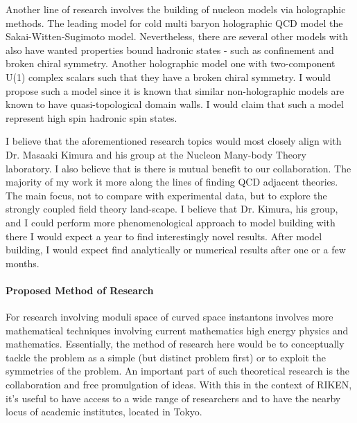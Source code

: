 \documentclass[12pt]{article}
\begin{document}
Another line of research involves the building of nucleon models via holographic methods.
%
The leading model for cold multi baryon holographic QCD model the Sakai-Witten-Sugimoto model.
%
Nevertheless, there are several other models with also have wanted properties bound hadronic states - such as confinement and broken chiral symmetry.
%
Another holographic model one with two-component U(1) complex scalars such that they have a broken chiral symmetry.
%
I would propose such a model since it is known that similar non-holographic models are known to have quasi-topological domain walls.
%
I would claim that such a model represent high spin hadronic spin states.

I believe that the aforementioned research topics would most closely align with Dr. Masaaki Kimura and his group at the Nucleon Many-body Theory laboratory.
%
I also believe that is there is mutual benefit to our collaboration.
%
The majority of my work it more along the lines of finding QCD adjacent theories.
%
The main focus, not to compare with experimental data, but to explore the strongly coupled field theory land-scape.
%
I believe that Dr. Kimura, his group, and I could perform more phenomenological approach to model building with there
I would expect a year to find interestingly novel results.
%
After model building, I would expect find analytically or numerical results after one or a few months.

\paragraph{Proposed Method of Research}

For research involving moduli space of curved space instantons involves more mathematical techniques involving current mathematics high energy physics and mathematics.
%
Essentially, the method of research here would be to conceptually tackle the problem as a simple (but distinct problem first) or to exploit the symmetries of the problem.
%
An important part of such theoretical research is the collaboration and free promulgation of ideas.
%
With this in the context of RIKEN, it's useful to have access to a wide range of researchers and to have the nearby locus of academic institutes, located in Tokyo.
\end{document}
